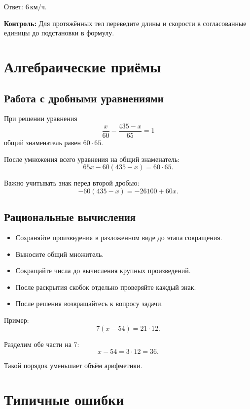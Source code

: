 \documentclass[a4paper,12pt]{article}
\newcommand{\unit}[1]{\,\text{#1}}
\newcommand{\checkpoint}[1]{%
  \par\smallskip
  {\color{warn}\textbf{Контроль:} #1}\par\smallskip
}
\begin{document}
Ответ: $6\unit{км/ч}$.

\checkpoint{
  Для протяжённых тел переведите длины и скорости
  в согласованные единицы до подстановки в формулу.
}

\section{Алгебраические приёмы}

\subsection{Работа с дробными уравнениями}

При решении уравнения
\[
\frac{x}{60}
-
\frac{435-x}{65}
=
1
\]
общий знаменатель равен $60\cdot65$.

После умножения всего уравнения на общий знаменатель:
\[
65x-60(435-x)=60\cdot65.
\]

Важно учитывать знак перед второй дробью:
\[
-60(435-x)
=
-26100+60x.
\]

\subsection{Рациональные вычисления}

\begin{itemize}
  \item Сохраняйте произведения в разложенном виде до этапа сокращения.
  \item Выносите общий множитель.
  \item Сокращайте числа до вычисления крупных произведений.
  \item После раскрытия скобок отдельно проверяйте каждый знак.
  \item После решения возвращайтесь к вопросу задачи.
\end{itemize}

Пример:
\[
7(x-54)=21\cdot12.
\]

Разделим обе части на $7$:
\[
x-54=3\cdot12=36.
\]

Такой порядок уменьшает объём арифметики.

\section{Типичные ошибки}
\end{document}
